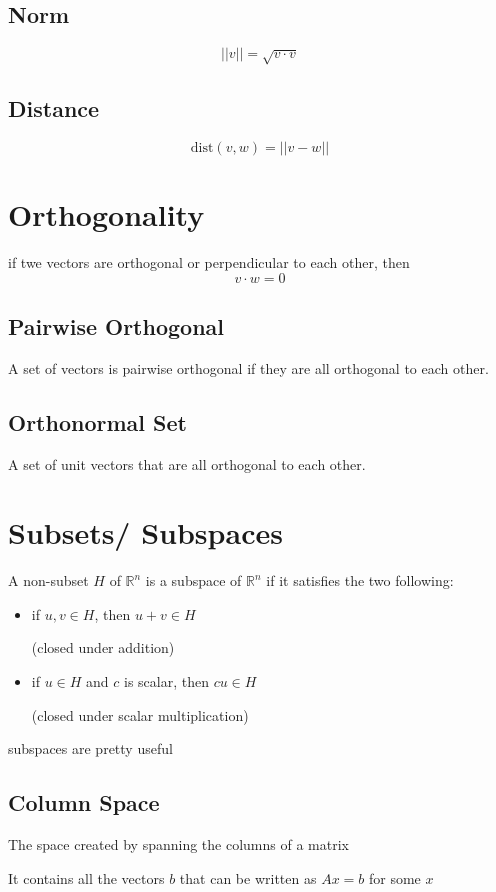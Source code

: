 \documentclass[fleqn]{report}
\begin{document}
\subsection{Norm}
\[
||v|| = \sqrt{v \cdot v}
\]

\subsection{Distance}
\[
\textrm{dist}(v, w) = ||v - w|| 
\]

\section{Orthogonality}
if twe vectors are orthogonal or perpendicular to each other, then 
\[
v \cdot w = 0
\]

\subsection{Pairwise Orthogonal}
A set of vectors is pairwise orthogonal if they are 
all orthogonal to each other. 

\subsection{Orthonormal Set}
A set of unit vectors that are all orthogonal to each other. 

\section{Subsets/ Subspaces}
A non-subset $H$ of $\mathbb{R}^n$ is a subspace of $\mathbb R^n$
if it satisfies the two following:
\begin{itemize}
    \item 
    if $u, v \in H$, then $u + v \in H$ 

    (closed under addition)
    \item 
    if $u \in H$ and $c$ is scalar, then $cu \in H$

    (closed under scalar multiplication)
\end{itemize}

subspaces are pretty useful

\subsection{Column Space}
The space created by spanning the columns of a matrix

It contains all the vectors $b$ that can be written as $Ax = b$ for some $x$
\end{document}
